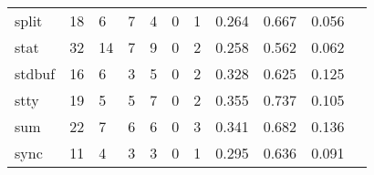 \begin{longtable}{lp{1.2cm}p{1.2cm}p{1.2cm}p{1.2cm}p{1.2cm}p{1.2cm}p{1.2cm}p{1.2cm}p{1.2cm}p{1.2cm}}
split     &                                    18 &                                                  6 &                                                  7 &                                                  4 &                                                  0 &                                                  1 &                                              0.264 &                                              0.667 &                                              0.056 \\
stat      &                                    32 &                                                 14 &                                                  7 &                                                  9 &                                                  0 &                                                  2 &                                              0.258 &                                              0.562 &                                              0.062 \\
stdbuf    &                                    16 &                                                  6 &                                                  3 &                                                  5 &                                                  0 &                                                  2 &                                              0.328 &                                              0.625 &                                              0.125 \\
stty      &                                    19 &                                                  5 &                                                  5 &                                                  7 &                                                  0 &                                                  2 &                                              0.355 &                                              0.737 &                                              0.105 \\
sum       &                                    22 &                                                  7 &                                                  6 &                                                  6 &                                                  0 &                                                  3 &                                              0.341 &                                              0.682 &                                              0.136 \\
sync      &                                    11 &                                                  4 &                                                  3 &                                                  3 &                                                  0 &                                                  1 &                                              0.295 &                                              0.636 &                                              0.091 \\

\end{longtable}
